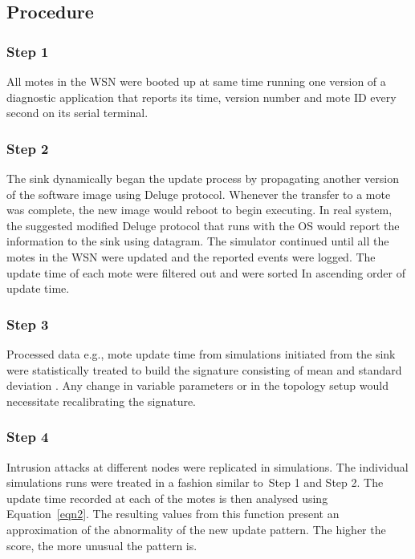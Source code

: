 \documentclass[conference]{IEEEtran}
\begin{document}
\subsection*{Procedure}
\label{subsec:proc}

\subsubsection*{Step 1} 
All motes in the WSN were booted up at same time running one version of a diagnostic application that reports its time, version number and mote ID every second on its serial terminal. 

\subsubsection*{Step 2} 
The sink dynamically began the update process by propagating another version of the software image using Deluge protocol. %
Whenever the transfer to a mote was complete, the new image would  reboot to begin executing.
In real system, the suggested modified Deluge protocol that runs with the OS would report the information to the sink using datagram.
The simulator continued until all the motes in the WSN were updated and the reported events were logged. 
The update time of each mote were filtered out  and were sorted In ascending order of update time.

\subsubsection*{Step 3} 
Processed data e.g., mote update time from simulations initiated from the sink were statistically treated to build the signature consisting of mean and standard deviation .
Any change in variable parameters or in the topology setup would necessitate recalibrating the signature.

\subsubsection*{Step 4} 
Intrusion attacks at different nodes were replicated in simulations.
The individual simulations runs were treated in a fashion  similar to~Step 1 and Step 2.
The update time recorded at each of the motes is then analysed using Equation~\ref{eqn2}.
The resulting values from this function present an approximation of the abnormality of the new update pattern. The higher the score, the more unusual the pattern is. 
\end{document}

